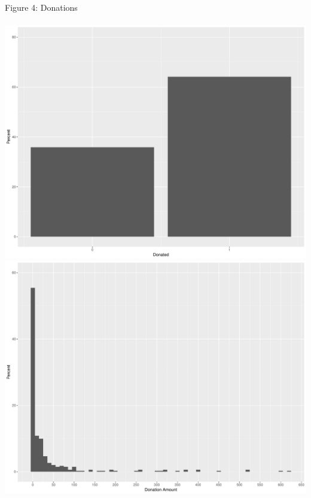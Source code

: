 \documentclass[12pt]{article}
\begin{document}
Figure 4: Donations\\ \\
\includegraphics[scale=0.35]{donated}\\
\includegraphics[scale=0.35]{donations}\\


	
\end{document}
